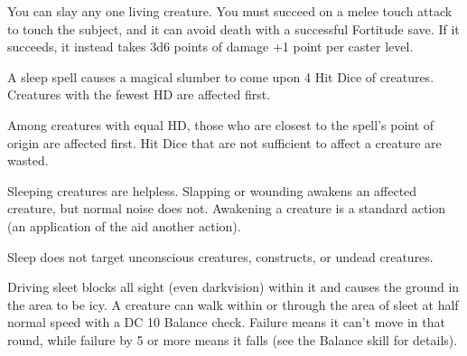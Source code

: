\begin{multicols}{2}
\begin{small}
\noindent You can slay any one living creature. You must succeed on a melee touch attack to touch the subject, and it can avoid death with a successful Fortitude save. If it succeeds, it instead takes 3d6 points of damage +1 point per caster level.

\noindent A sleep spell causes a magical slumber to come upon 4 Hit Dice of creatures. Creatures with the fewest HD are affected first.

\smallskip\noindent Among creatures with equal HD, those who are closest to the spell's point of origin are affected first. Hit Dice that are not sufficient to affect a creature are wasted.

\smallskip\noindent Sleeping creatures are helpless. Slapping or wounding awakens an affected creature, but normal noise does not. Awakening a creature is a standard action (an application of the aid another action).

\smallskip\noindent Sleep does not target unconscious creatures, constructs, or undead creatures.


\noindent Driving sleet blocks all sight (even darkvision) within it and causes the ground in the area to be icy. A creature can walk within or through the area of sleet at half normal speed with a DC 10 Balance check. Failure means it can't move in that round, while failure by 5 or more means it falls (see the Balance skill for details).


\end{small}
\end{multicols}
